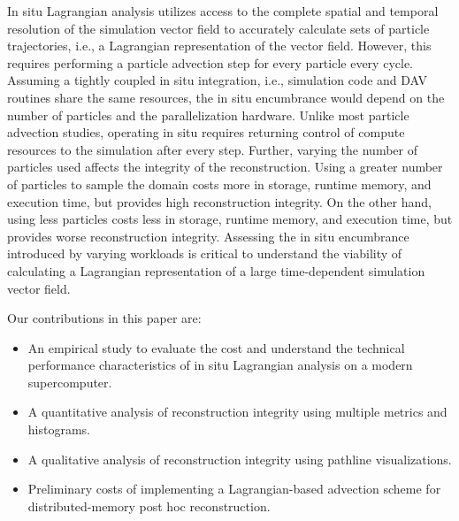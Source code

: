 In situ Lagrangian analysis utilizes access to the complete spatial and temporal resolution of the simulation vector field to accurately calculate sets of particle trajectories, i.e., a Lagrangian representation of the vector field. 
%
However, this requires performing a particle advection step for every particle every cycle.
%
Assuming a tightly coupled in situ integration, i.e., simulation code and DAV routines share the same resources, the in situ encumbrance would depend on the number of particles and the parallelization hardware.
%
Unlike most particle advection studies, operating in situ requires returning control of compute resources to the simulation after every step.
%
Further, varying the number of particles used affects the integrity of the reconstruction.
%
Using a greater number of particles to sample the domain costs more in storage, runtime memory, and execution time, but provides high reconstruction integrity.
%
On the other hand, using less particles costs less in storage, runtime memory, and execution time, but provides worse reconstruction integrity. 
%
Assessing the in situ encumbrance introduced by varying workloads is critical to understand the viability of calculating a Lagrangian representation of a large time-dependent simulation vector field.
%

Our contributions in this paper are:
\begin{itemize}
\item An empirical study to evaluate the cost and understand the technical performance characteristics of in situ Lagrangian analysis on a modern supercomputer.
\item A quantitative analysis of reconstruction integrity using multiple metrics and histograms.
\item A qualitative analysis of reconstruction integrity using pathline visualizations.
\item Preliminary costs of implementing a Lagrangian-based advection scheme for distributed-memory post hoc reconstruction.
\end{itemize}






